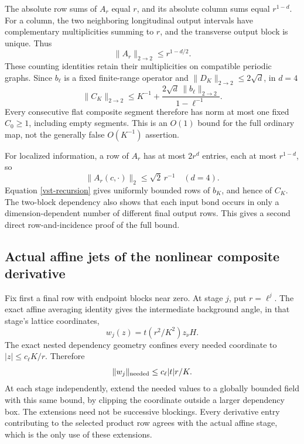 \documentclass[11pt]{article}
\theoremstyle{remark}
\begin{document}
The absolute row sums of \(A_r\) equal \(r\), and its
absolute column sums equal \(r^{1-d}\). For a column,
the two neighboring longitudinal output intervals have
complementary multiplicities summing to \(r\), and the
transverse output block is unique. Thus
\begin{equation}
                \|A_r\|_{2\to2}\le r^{1-d/2}.
 \label{vst-straight-norm}
\end{equation}
These counting identities retain their multiplicities
on compatible periodic graphs. Since \(b_\ell\) is a
fixed finite-range operator and
\(\|D_K\|_{2\to2}\le2\sqrt d\), in \(d=4\)
\begin{equation}
 \|C_K\|_{2\to2}
 \le K^{-1}+
       \frac{2\sqrt d\,\|b_\ell\|_{2\to2}}{1-\ell^{-1}}.
 \label{vst-full-flat}
\end{equation}
Every consecutive flat composite segment therefore has
norm at most one fixed \(C_0\ge1\), including empty segments.
This is an \(O(1)\) bound for the full ordinary map, not
the generally false \(O(K^{-1})\) assertion.

For localized information, a row of \(A_r\) has at most
\(2r^d\) entries, each at most \(r^{1-d}\), so
\[
              \|A_r(c,\cdot)\|_2\le\sqrt2\,r^{-1}
                         \quad(d=4).
 \]
Equation \eqref{vst-recursion} gives uniformly bounded
rows of \(b_K\), and hence of \(C_K\).
The two-block dependency also shows that each input
bond occurs in only a dimension-dependent number of
different final output rows. This gives a second direct
row-and-incidence proof of the full bound.

\subsection{Actual affine jets of the nonlinear composite derivative}
\label{vst-magnetic-section}

Fix first a final row with endpoint blocks near zero.
At stage \(j\), put \(r=\ell^j\). The exact affine
averaging identity gives the intermediate background
angle, in that stage's lattice coordinates,
\[
                     w_j(z)=t(r^2/K^2)z_\nu H.
\]
The exact nested dependency geometry confines every
needed coordinate to \(|z|\le c_\ell K/r\). Therefore
\begin{equation}
                  \|w_j\|_{\rm needed}
                            \le c_\ell |t|r/K.
 \label{vst-stage-smallness}
\end{equation}
At each stage independently, extend the needed values
to a globally bounded field with this same bound, by
clipping the coordinate outside a larger dependency box.
The extensions need not be successive blockings.
Every derivative entry contributing to the selected
product row agrees with the actual affine stage, which
is the only use of these extensions.
\end{document}
